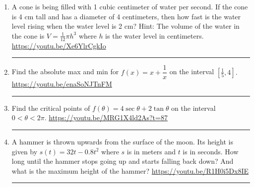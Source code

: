 \documentclass[12pt]{article}
\begin{document}
\begin{enumerate}
\newpage
\item A cone is being filled with 1 cubic centimeter of water per second.  If the cone is 4 cm tall and has a diameter of 4 centimeters, then how fast is the water level rising when the water level is 2 cm?  Hint: The volume of the water in the cone is $V = \tfrac{1}{12} \pi h^3$ where $h$ is the water level in centimeters.  
\vfill 
\hfill  \url{https://youtu.be/Xe6YlrCgkIo}
\hrule 


\item Find the absolute max and min for $f(x) = x + \dfrac{1}{x}$ on the interval $[\tfrac{1}{5}, 4].$
\vfill 
\hfill  \url{https://youtu.be/enaSoNJTnFM} 
\hrule 


\item Find the critical points of $f(\theta) = 4 \sec \theta + 2 \tan \theta$ on the interval $0  < \theta < 2\pi$. 
\vfill 
\hfill  \url{https://youtu.be/MRG1X4ld2As?t=87} 
\hrule 


\item A hammer is thrown upwards from the surface of the moon.  Its height is given by $s(t)  = 32t - 0.8t^2$ where $s$ is in meters and $t$ is in seconds.  How long until the hammer stops going up and starts falling back down? And what is the maximum height of the hammer?
\vfill 
\hfill  \url{https://youtu.be/R1H0i5Dx8IE} 
\hrule 

\end{enumerate}
\end{document}
